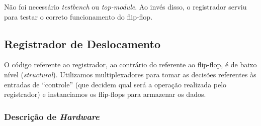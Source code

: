 \documentclass[a4paper,12pt]{article}
\begin{document}
Não foi necessário \textit{testbench} ou \textit{top-module}. Ao invés disso, o registrador serviu para testar o correto funcionamento do flip-flop.

\newpage

\subsection{Registrador de Deslocamento}
O código referente ao registrador, ao contrário do referente ao flip-flop, é de baixo nível (\textit{structural}). Utilizamos multiplexadores para tomar as decisões referentes às entradas de ``controle'' (que decidem qual será a operação realizada pelo registrador) e instanciamos os flip-flops para armazenar os dados.

\subsubsection{Descrição de \textit{Hardware}}
\end{document}

